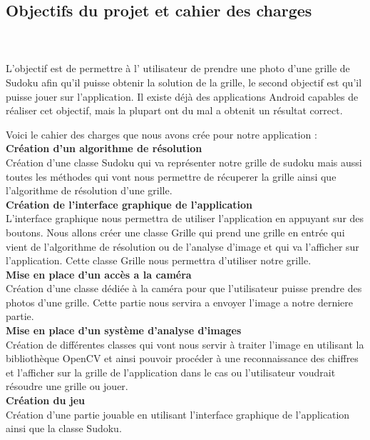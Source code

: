 \documentclass{article}
\begin{document}
\newpage
\subsection*{Objectifs du projet et cahier des charges}\\\\
L’objectif est de permettre à l' utilisateur de prendre une photo d'une grille de Sudoku afin qu'il puisse 
obtenir la solution de la grille, le second objectif est qu'il puisse jouer sur l'application.
Il existe déjà des applications Android capables de réaliser cet objectif, mais la plupart ont du mal a obtenit un résultat correct.


Voici le cahier des charges que nous avons crée pour notre application :\\

\textbf{ Création d'un algorithme de résolution}\\
Création d'une classe Sudoku qui va représenter notre grille de sudoku mais aussi toutes les méthodes qui vont nous permettre de récuperer la grille ainsi que l'algorithme de résolution d'une grille.\\

\textbf{Création de l'interface graphique de l'application}\\
L'interface graphique nous permettra de utiliser l'application en appuyant sur des boutons.
Nous allons créer une classe Grille qui prend une grille en entrée qui vient de l'algorithme de résolution ou de l'analyse d'image et qui va l'afficher sur l'application. Cette classe Grille nous permettra d'utiliser notre grille.
\\

\textbf{Mise en place d'un accès a la caméra}\\
Création d'une classe dédiée à la caméra pour que l'utilisateur puisse prendre des photos d'une grille.
Cette partie nous servira a envoyer l'image a notre derniere partie.\\

\textbf{Mise en place d'un système d'analyse d'images}\\
Création de différentes classes qui vont nous servir à traiter l'image en utilisant la bibliothèque OpenCV
et ainsi pouvoir procéder à une reconnaissance des chiffres et l'afficher sur la grille de l'application dans le cas ou l'utilisateur voudrait résoudre une grille ou jouer.\\

\textbf{Création du jeu}\\
Création d'une partie jouable en utilisant l'interface graphique de l'application ainsi que la classe Sudoku.\\
\end{document}

